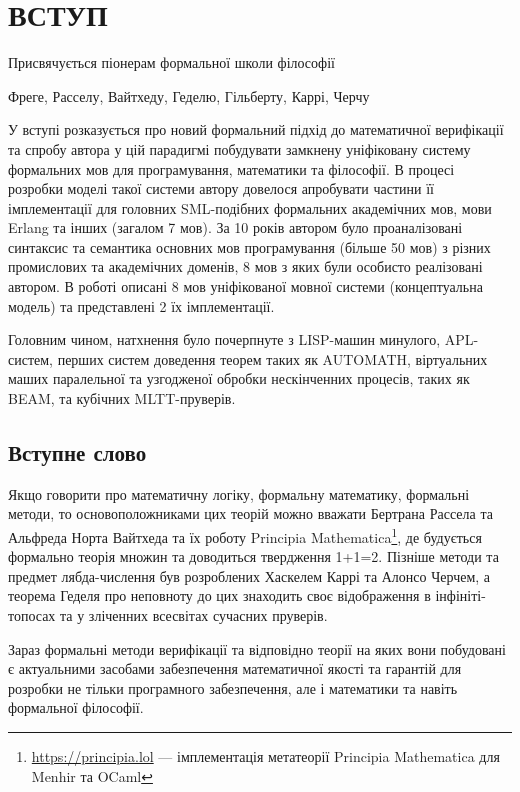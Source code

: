 \chapter*{ВСТУП}
\epigraph{Присвячується піонерам формальної школи філософії}
         {Фреге, Расселу, Вайтхеду, Геделю, Гільберту, Каррі, Черчу}

У вступі розказується про новий формальний підхід до математичної верифікації та спробу автора
у цій парадигмі побудувати замкнену уніфіковану систему формальних мов для
програмування, математики та філософії. В процесі розробки моделі такої системи автору
довелося апробувати частини її імплементації для головних SML-подібних формальних академічних мов,
мови Erlang та інших (загалом 7 мов). За 10 років автором було проаналізовані
синтаксис та семантика основних мов програмування (більше 50 мов) з різних промислових
та академічних доменів, 8 мов з яких були особисто реалізовані автором. В роботі
описані 8 мов уніфікованої мовної системи (концептуальна модель) та представлені 2 їх імплементації.

Головним чином, натхнення було почерпнуте з LISP-машин минулого, APL-систем,
перших систем доведення теорем таких як AUTOMATH, віртуальних маших паралельної
та узгодженої обробки нескінченних процесів, таких як BEAM, та кубічних MLTT-пруверів.

\section*{Вступне слово}
Якщо говорити про математичну логіку, формальну математику, формальні методи,
то основоположниками цих теорій можно вважати Бертрана Рассела та Альфреда Норта Вайтхеда та їх роботу
Principia Mathematica\footnote{\url{https://principia.lol} --- імплементація метатеорії Principia Mathematica для Menhir та OCaml},
де будується формально теорія множин та доводиться твердження 1+1=2. Пізніше методи та предмет
лябда-числення був розроблених Хаскелем Каррі та Алонсо Черчем, а теорема Геделя про неповноту до цих
знаходить своє відображення в інфініті-топосах та у зліченних всесвітах сучасних пруверів.

Зараз формальні методи верифікації та відповідно теорії на яких вони побудовані
є актуальними засобами забезпечення математичної якості та гарантій для розробки не тільки
програмного забезпечення, але і математики та навіть формальної філософії.

